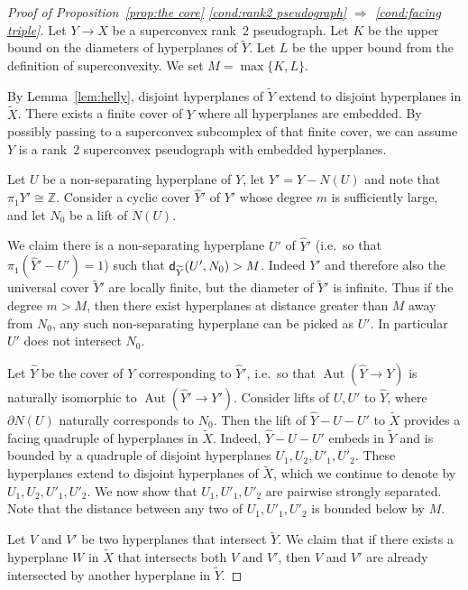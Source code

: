 \documentclass[12pt,oneside]{amsart}
\theoremstyle{definition}
\theoremstyle{definition}
\theoremstyle{remark}
\newcommand{\dist}{\textup{\textsf{d}}}
\newcommand{\field}[1]{\mathbb{#1}}
\newcommand{\integers}{\ensuremath{\field{Z}}}
\DeclareMathOperator{\Aut}{Aut}
\begin{document}
\begin{proof}[Proof of Proposition~\ref{prop:the core} \eqref{cond:rank2 pseudograph} $\Rightarrow$ \eqref{cond:facing triple}]
 Let $Y \rightarrow X$ be a superconvex rank~$2$ pseudograph. Let $K$ be the upper bound on  the diameters of  hyperplanes of $\widetilde Y$.
 Let $L$ be the upper bound from the definition of superconvexity. We set $M = \max\{K,L\}$.
 
By Lemma~\ref{lem:helly}, disjoint hyperplanes of $\widetilde Y$ extend to disjoint hyperplanes in $\widetilde X$. 
There exists a finite cover of $Y$ where all hyperplanes are embedded. By possibly passing to a superconvex subcomplex of that finite cover, we can assume $Y$ is a rank~$2$ superconvex pseudograph with embedded hyperplanes.

Let $U$ be a non-separating hyperplane of $Y$, let $Y'=Y-N(U)$ and note that $\pi_1Y'\cong \integers$.
Consider a cyclic cover $\widehat Y'$ of $Y'$ whose degree $m$ is sufficiently large, and let $N_0$ be a lift of $N(U)$.

We claim there is a non-separating hyperplane $U'$  of $\widehat Y'$ (i.e.\ so that  $\pi_1(\widehat Y'-U')=1$) such that $\dist_{\widetilde Y}(U', N_0)>M$. Indeed $Y'$ and therefore also the universal cover $\widetilde Y'$ are locally finite, but the diameter of $\widetilde Y'$ is infinite. Thus if the degree $m>M$, then there exist hyperplanes at distance greater than $M$ away from $N_0$, any such non-separating hyperplane can be picked as $U'$. 
In particular $U'$ does not intersect $N_0$.



Let $\widehat Y$ be the cover of $Y$ corresponding to $\widehat Y'$, i.e.\ so that $\Aut(\widehat Y\to Y)$ is naturally isomorphic to $\Aut(\widehat Y'\to Y')$. 
Consider lifts of $U,U'$ to $\widehat Y$, where $\partial N(U)$ naturally corresponds to $N_0$.
%
Then the lift of $\widehat Y-U-U'$ to $\widetilde X$ provides a facing quadruple of hyperplanes in $\widetilde X$. Indeed, $\widehat Y-U-U'$ embeds in $\widetilde Y$ and is bounded by a quadruple of disjoint hyperplanes $U_1, U_2, U'_1, U'_2$. These hyperplanes extend to disjoint hyperplanes of $\widetilde X$, which we continue to denote by $U_1, U_2, U'_1, U'_2$. We now show that $U_1, U'_1, U'_2$ are pairwise strongly separated.  Note that the distance between any two of $U_1, U'_1, U'_2$ is bounded below by $M$. 


Let $V$ and $V'$ be two hyperplanes that intersect $\widetilde Y$.
We claim that if there exists a hyperplane $W$ in $\widetilde X$ that intersects both $V$ and $V'$, then $V$ and $V'$ are already intersected by another hyperplane in $\widetilde Y$.


\end{proof}
\end{document}
